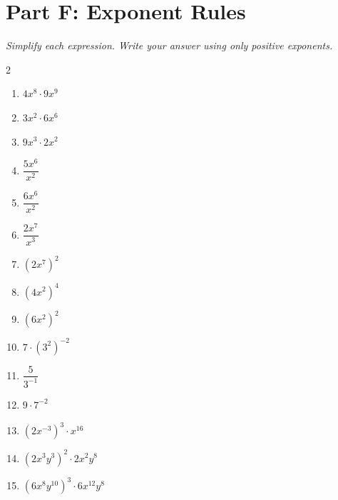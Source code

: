 \documentclass[11pt]{article}
\begin{document}
\section*{Part F: Exponent Rules}
\noindent\textit{Simplify each expression. Write your answer using only positive exponents.}
\begin{multicols}{2}
\begin{enumerate}
  \item $4x^{8} \cdot 9x^{9}$
  \vspace{1.4cm}
  \item $3x^{2} \cdot 6x^{6}$
  \vspace{1.4cm}
  \item $9x^{3} \cdot 2x^{2}$
  \vspace{1.4cm}
  \item $\dfrac{5x^{6}}{x^{2}}$
  \vspace{1.4cm}
  \item $\dfrac{6x^{6}}{x^{2}}$
  \vspace{1.4cm}
  \item $\dfrac{2x^{7}}{x^{3}}$
  \vspace{1.4cm}
  \item $(2x^{7})^{2}$
  \vspace{1.4cm}
  \item $(4x^{2})^{4}$
  \vspace{1.4cm}
  \item $(6x^{2})^{2}$
  \vspace{1.4cm}
  \item $7 \cdot (3^{2})^{-2}$
  \vspace{1.4cm}
  \item $\dfrac{5}{3^{-1}}$
  \vspace{1.4cm}
  \item $9 \cdot 7^{-2}$
  \vspace{1.4cm}
  \item $(2x^{-3})^{3} \cdot x^{16}$
  \vspace{1.4cm}
  \item $(2x^{3}y^{3})^{2} \cdot 2x^{2}y^{8}$
  \vspace{1.4cm}
  \item $(6x^{8}y^{10})^{3} \cdot 6x^{12}y^{8}$
  \vspace{1.4cm}
\end{enumerate}
\end{multicols}
\end{document}
